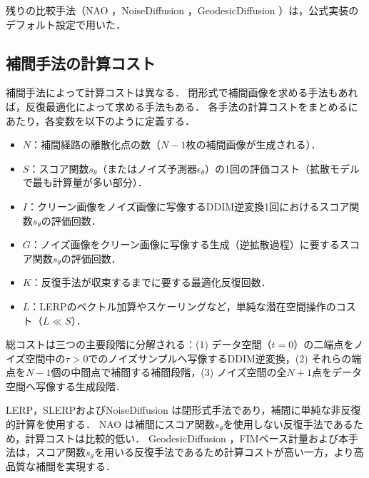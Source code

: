 \documentclass[MIRU,submit]{miru2026j}
\theoremstyle{definition}
\begin{document}
残りの比較手法（NAO \cite{Samuel2023}，NoiseDiffusion \cite{Zheng2024}，GeodesicDiffusion \cite{Yu2025}）は，公式実装のデフォルト設定で用いた．

\subsection{補間手法の計算コスト}\label{appendix:comp_cost}

補間手法によって計算コストは異なる．
閉形式で補間画像を求める手法もあれば，反復最適化によって求める手法もある．
各手法の計算コストをまとめるにあたり，各変数を以下のように定義する．
\begin{itemize}
    \item $N$：補間経路の離散化点の数（$N-1$枚の補間画像が生成される）．
    \item $S$：スコア関数$s_\theta$（またはノイズ予測器$\epsilon_\theta$）の1回の評価コスト（拡散モデルで最も計算量が多い部分）．
    \item $I$：クリーン画像をノイズ画像に写像するDDIM逆変換1回におけるスコア関数$s_\theta$の評価回数．
    \item $G$：ノイズ画像をクリーン画像に写像する生成（逆拡散過程）に要するスコア関数$s_\theta$の評価回数．
    \item $K$：反復手法が収束するまでに要する最適化反復回数．
    \item $L$：LERPのベクトル加算やスケーリングなど，単純な潜在空間操作のコスト（$L \ll S$）．
\end{itemize}
総コストは三つの主要段階に分解される：(1) データ空間（$t=0$）の二端点をノイズ空間中の$\tau>0$でのノイズサンプルへ写像するDDIM逆変換，(2) それらの端点を$N-1$個の中間点で補間する補間段階，(3) ノイズ空間の全$N+1$点をデータ空間へ写像する生成段階．

LERP，SLERPおよびNoiseDiffusion \cite{Zheng2024}は閉形式手法であり，補間に単純な非反復的計算を使用する．
NAO \cite{Samuel2023}は補間にスコア関数$s_\theta$を使用しない反復手法であるため，計算コストは比較的低い．
GeodesicDiffusion \cite{Yu2025}，FIMベース計量\cite{Azeglio2025}および本手法は，スコア関数$s_\theta$を用いる反復手法であるため計算コストが高い一方，より高品質な補間を実現する．
\end{document}
